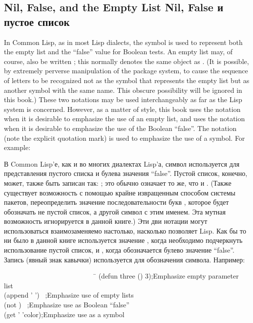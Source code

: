 \subsection{Nil, False, and the Empty List Nil, False и пустое список}

In Common Lisp, as in most Lisp dialects, the symbol 
is used to represent both the empty list and the ``false'' value
for Boolean tests.  An empty list may, of course, also be written
\cd{()}; this normally denotes the same object as .
(It is possible, by extremely perverse manipulation of the package system,
to cause the sequence of letters  to be recognized
not as the symbol that represents the empty list but as another
symbol with the same name.  This obscure possibility will be ignored
in this book.)
These two notations may be used interchangeably as far as the Lisp
system is concerned.  However, as a matter of style,
this book
uses the notation {\empty} when it is desirable to emphasize
the use of an empty list, and uses the notation {\false}
when it is desirable to emphasize the use of the Boolean ``false''.
The notation  (note the explicit quotation mark) is used to emphasize
the use of a symbol.
For example:

В Common Lisp'е, как и во многих диалектах Lisp'а, символ  используется
для представления пустого списка и булева значения ``false''. Пустой список,
конечно, может, также быть записан так: \cd{()}; это обычно означает то же, что
и .
(Также существует возможность с помощью крайне извращенным способом системы
пакетов, переопределить значение последовательности букв , которое будет
обозначать не пустой список, а другой символ с этим именем. Эта мутная
возможность игнорируется в данной книге.)
Эти дви нотации могут использоваться взаимозаменяемо настолько, насколько
позволяет Lisp. Как бы то ни было в данной книге используется значение {\empty},
когда необходимо подчеркнуть использование пустой список, и {\false}, когда
обозначается булево значение ``false''. Запись  (явный знак кавычки)
используется для обозначения символа.
Например:
\begin{lisp}
~~~~~~~~~~~~~~~~~~~~~~~~~~~\=\kill
(defun three () 3)\>;{\rm Emphasize empty parameter list} \\
(append '{\empty} '{\empty}) \EV\ {\empty}\>;{\rm Emphasize use of empty lists} \\
(not {\false}) \EV\ {\true}\>;{\rm Emphasize use as Boolean ``false''} \\
(get '{\nil} 'color)\>;{\rm Emphasize use as a symbol}
\end{lisp}

